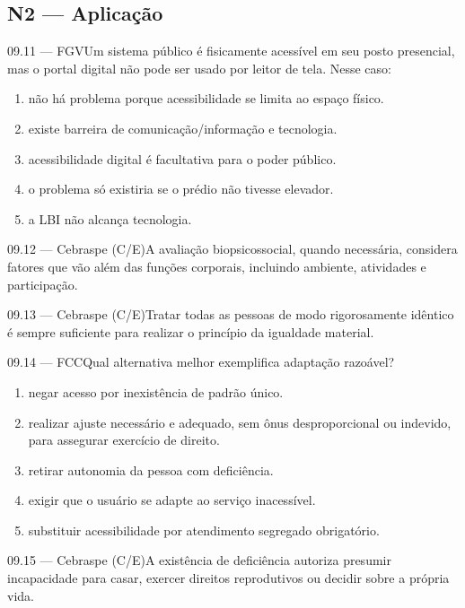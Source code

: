 \subsection*{N2 — Aplicação}
\begin{questao}{ 09.11 — FGV}Um sistema público é fisicamente acessível em seu posto presencial, mas o portal digital não pode ser usado por leitor de tela. Nesse caso:\begin{enumerate}[label=\Alph*)]\item não há problema porque acessibilidade se limita ao espaço físico.\item existe barreira de comunicação/informação e tecnologia.\item acessibilidade digital é facultativa para o poder público.\item o problema só existiria se o prédio não tivesse elevador.\item a LBI não alcança tecnologia.\end{enumerate}\end{questao}
\begin{questao}{ 09.12 — Cebraspe (C/E)}A avaliação biopsicossocial, quando necessária, considera fatores que vão além das funções corporais, incluindo ambiente, atividades e participação.\end{questao}
\begin{questao}{ 09.13 — Cebraspe (C/E)}Tratar todas as pessoas de modo rigorosamente idêntico é sempre suficiente para realizar o princípio da igualdade material.\end{questao}
\begin{questao}{ 09.14 — FCC}Qual alternativa melhor exemplifica adaptação razoável?\begin{enumerate}[label=\Alph*)]\item negar acesso por inexistência de padrão único.\item realizar ajuste necessário e adequado, sem ônus desproporcional ou indevido, para assegurar exercício de direito.\item retirar autonomia da pessoa com deficiência.\item exigir que o usuário se adapte ao serviço inacessível.\item substituir acessibilidade por atendimento segregado obrigatório.\end{enumerate}\end{questao}
\begin{questao}{ 09.15 — Cebraspe (C/E)}A existência de deficiência autoriza presumir incapacidade para casar, exercer direitos reprodutivos ou decidir sobre a própria vida.\end{questao}
